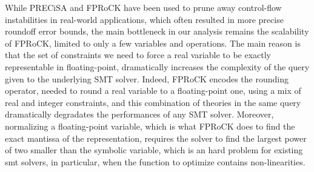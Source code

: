 While PRECiSA and FPRoCK have been used to prune away control-flow instabilities in real-world applications, which often resulted in more precise roundoff error bounds, the main bottleneck in our analysis remains the scalability of FPRoCK, limited to only a few variables and operations. 
%
The main reason is that the set of constraints we need to force a real variable to be exactly representable in floating-point, dramatically increases the complexity of the query given to the underlying SMT solver.
%
Indeed, FPRoCK encodes the rounding operator, needed to round a real variable to a floating-point one, using a mix of real and integer constraints, and this combination of theories in the same query dramatically degradates the performances of any SMT solver.
%
Moreover, normalizing a floating-point variable, which is what FPRoCK does to find the exact mantissa of the representation, requires the solver to find the largest power of two smaller than the symbolic variable, which is an hard problem for existing smt solvers, in particular, when the function to optimize contains non-linearities.
%

